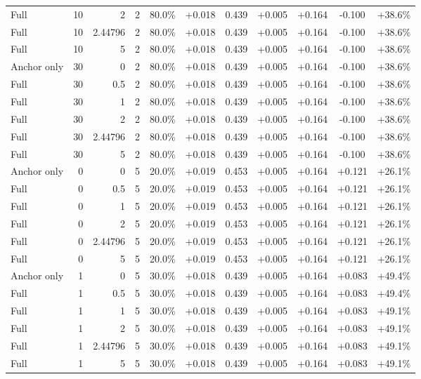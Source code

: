 \begin{table}[htbp]
\begin{tabular}{lrrrccccccc}
Full & 10 & 2 & 2 & 80.0\% & +0.018 & 0.439 & +0.005 & +0.164 & -0.100 & +38.6\% \\
Full & 10 & 2.44796 & 2 & 80.0\% & +0.018 & 0.439 & +0.005 & +0.164 & -0.100 & +38.6\% \\
Full & 10 & 5 & 2 & 80.0\% & +0.018 & 0.439 & +0.005 & +0.164 & -0.100 & +38.6\% \\
Anchor only & 30 & 0 & 2 & 80.0\% & +0.018 & 0.439 & +0.005 & +0.164 & -0.100 & +38.6\% \\
Full & 30 & 0.5 & 2 & 80.0\% & +0.018 & 0.439 & +0.005 & +0.164 & -0.100 & +38.6\% \\
Full & 30 & 1 & 2 & 80.0\% & +0.018 & 0.439 & +0.005 & +0.164 & -0.100 & +38.6\% \\
Full & 30 & 2 & 2 & 80.0\% & +0.018 & 0.439 & +0.005 & +0.164 & -0.100 & +38.6\% \\
Full & 30 & 2.44796 & 2 & 80.0\% & +0.018 & 0.439 & +0.005 & +0.164 & -0.100 & +38.6\% \\
Full & 30 & 5 & 2 & 80.0\% & +0.018 & 0.439 & +0.005 & +0.164 & -0.100 & +38.6\% \\
Anchor only & 0 & 0 & 5 & 20.0\% & +0.019 & 0.453 & +0.005 & +0.164 & +0.121 & +26.1\% \\
Full & 0 & 0.5 & 5 & 20.0\% & +0.019 & 0.453 & +0.005 & +0.164 & +0.121 & +26.1\% \\
Full & 0 & 1 & 5 & 20.0\% & +0.019 & 0.453 & +0.005 & +0.164 & +0.121 & +26.1\% \\
Full & 0 & 2 & 5 & 20.0\% & +0.019 & 0.453 & +0.005 & +0.164 & +0.121 & +26.1\% \\
Full & 0 & 2.44796 & 5 & 20.0\% & +0.019 & 0.453 & +0.005 & +0.164 & +0.121 & +26.1\% \\
Full & 0 & 5 & 5 & 20.0\% & +0.019 & 0.453 & +0.005 & +0.164 & +0.121 & +26.1\% \\
Anchor only & 1 & 0 & 5 & 30.0\% & +0.018 & 0.439 & +0.005 & +0.164 & +0.083 & +49.4\% \\
Full & 1 & 0.5 & 5 & 30.0\% & +0.018 & 0.439 & +0.005 & +0.164 & +0.083 & +49.4\% \\
Full & 1 & 1 & 5 & 30.0\% & +0.018 & 0.439 & +0.005 & +0.164 & +0.083 & +49.1\% \\
Full & 1 & 2 & 5 & 30.0\% & +0.018 & 0.439 & +0.005 & +0.164 & +0.083 & +49.1\% \\
Full & 1 & 2.44796 & 5 & 30.0\% & +0.018 & 0.439 & +0.005 & +0.164 & +0.083 & +49.1\% \\
Full & 1 & 5 & 5 & 30.0\% & +0.018 & 0.439 & +0.005 & +0.164 & +0.083 & +49.1\% \\

\end{tabular}
\end{table}
